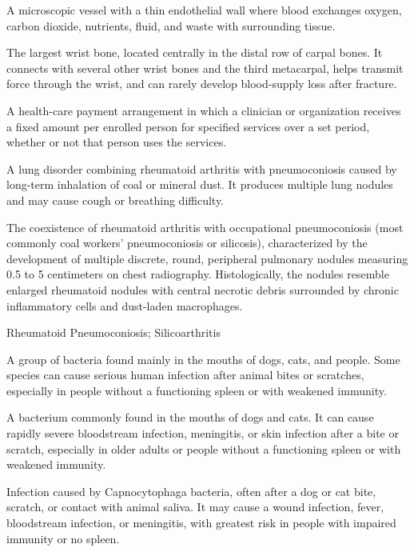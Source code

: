  A microscopic vessel with a thin endothelial wall where blood exchanges oxygen, carbon dioxide, nutrients, fluid, and waste with surrounding tissue.

 The largest wrist bone, located centrally in the distal row of carpal bones. It connects with several other wrist bones and the third metacarpal, helps transmit force through the wrist, and can rarely develop blood-supply loss after fracture.

 A health-care payment arrangement in which a clinician or organization receives a fixed amount per enrolled person for specified services over a set period, whether or not that person uses the services.

 A lung disorder combining rheumatoid arthritis with pneumoconiosis caused by long-term inhalation of coal or mineral dust. It produces multiple lung nodules and may cause cough or breathing difficulty.

 The coexistence of rheumatoid arthritis with occupational pneumoconiosis (most commonly coal workers' pneumoconiosis or silicosis), characterized by the development of multiple discrete, round, peripheral pulmonary nodules measuring 0.5 to 5 centimeters on chest radiography. Histologically, the nodules resemble enlarged rheumatoid nodules with central necrotic debris surrounded by chronic inflammatory cells and dust-laden macrophages.

\synonyms
Rheumatoid Pneumoconiosis; Silicoarthritis

 A group of bacteria found mainly in the mouths of dogs, cats, and people. Some species can cause serious human infection after animal bites or scratches, especially in people without a functioning spleen or with weakened immunity.

 A bacterium commonly found in the mouths of dogs and cats. It can cause rapidly severe bloodstream infection, meningitis, or skin infection after a bite or scratch, especially in older adults or people without a functioning spleen or with weakened immunity.

 Infection caused by Capnocytophaga bacteria, often after a dog or cat bite, scratch, or contact with animal saliva. It may cause a wound infection, fever, bloodstream infection, or meningitis, with greatest risk in people with impaired immunity or no spleen.

